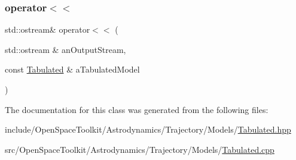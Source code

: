 \subsubsection{\texorpdfstring{operator$<$$<$}{operator<<}}
{\footnotesize\ttfamily std\+::ostream\& operator$<$$<$ (\begin{DoxyParamCaption}\item[{std\+::ostream \&}]{an\+Output\+Stream,  }\item[{const \hyperlink{classostk_1_1astro_1_1trajectory_1_1models_1_1_tabulated}{Tabulated} \&}]{a\+Tabulated\+Model }\end{DoxyParamCaption})\hspace{0.3cm}{\ttfamily [friend]}}



The documentation for this class was generated from the following files\+:\begin{DoxyCompactItemize}
\item 
include/\+Open\+Space\+Toolkit/\+Astrodynamics/\+Trajectory/\+Models/\hyperlink{_models_2_tabulated_8hpp}{Tabulated.\+hpp}\item 
src/\+Open\+Space\+Toolkit/\+Astrodynamics/\+Trajectory/\+Models/\hyperlink{_models_2_tabulated_8cpp}{Tabulated.\+cpp}\end{DoxyCompactItemize}
